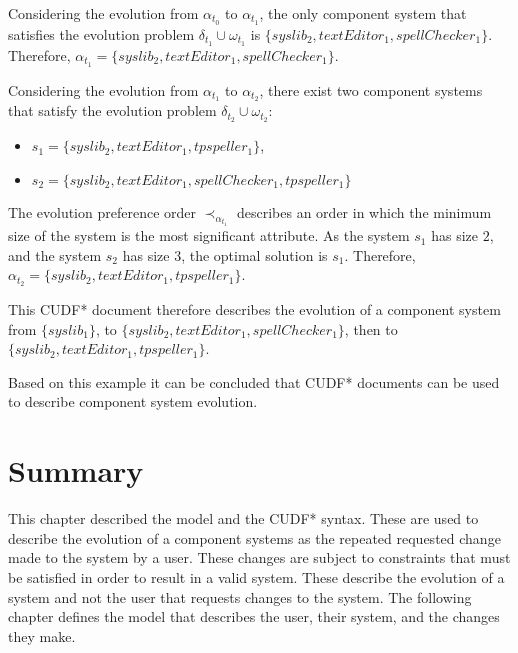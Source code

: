 Considering the evolution from $\alpha_{t_0}$ to $\alpha_{t_1}$,
the only component system that satisfies the evolution problem $\delta_{t_1} \cup \omega_{t_1}$
is $\{syslib_2, textEditor_1, spellChecker_1\}$.
Therefore, $\alpha_{t_1} = \{syslib_2, textEditor_1, spellChecker_1\}$.

Considering the evolution from $\alpha_{t_1}$ to $\alpha_{t_2}$,
there exist two component systems that satisfy the evolution problem $\delta_{t_2} \cup \omega_{t_2}$:
\begin{itemize}
  \item $s_1 = \{syslib_2, textEditor_1, tpspeller_1\}$,
  \item $s_2 = \{syslib_2, textEditor_1, spellChecker_1, tpspeller_1\}$
\end{itemize}

The evolution preference order $\prec_{\alpha_{t_1}}$ describes an order in which the minimum size of the system is the most significant attribute.
As the system $s_1$ has size $2$, and the system $s_2$ has size $3$, the optimal solution is $s_1$.
Therefore, $\alpha_{t_2} = \{syslib_2, textEditor_1, tpspeller_1\}$.

This CUDF* document therefore describes the evolution of a component system from 
$\{syslib_1\}$, to $\{syslib_2, textEditor_1, spellChecker_1\}$, then to $\{syslib_2, textEditor_1, tpspeller_1\}$.

Based on this example it can be concluded that CUDF* documents can be used to describe component system evolution. 

\section{Summary}
This chapter described the \modelname model and the CUDF* syntax. 
These are used to describe the evolution of a component systems as the repeated requested change made to the system by a user.
These changes are subject to constraints that must be satisfied in order to result in a valid system.
These describe the evolution of a system and not the user that requests changes to the system.
The following chapter defines the \modelname model that describes the user, their system, and the changes they make.

